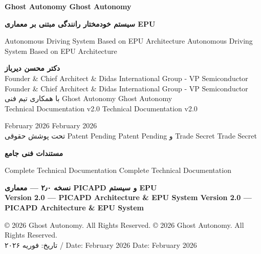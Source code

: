 \documentclass[10pt,twoside,openright]{report}
\makeatletter
\DeclareRobustCommand{\lat}[1]{%
  \ifHy@pdfstring
    #1%
  \else
    \beginL\setlatin #1\endL%
  \fi
}
\makeatother
\begin{document}
\begin{titlepage}
\centering
\vspace*{2cm}

{\Huge\bfseries\color{partExecutive}\lat{Ghost Autonomy}\par}
\vspace{0.3cm}
{\LARGE\bfseries\color{headerColor}سیستم خودمختار رانندگی مبتنی بر معماری EPU\par}
\vspace{0.3cm}
{\Large\color{chapterStrategy}\lat{Autonomous Driving System Based on EPU Architecture}\par}

\vspace{3cm}

\begin{tcolorbox}[
  colback=conceptBox,
  colframe=partExecutive,
  width=0.8\textwidth,
  arc=3mm,
  boxrule=1pt
]
\centering
\large
\textbf{دکتر محسن دیرباز}\\[5pt]
\lat{Founder \& Chief Architect \& Didas International Group - VP Semiconductor}\\[10pt]
\normalsize
با همکاری تیم فنی \lat{Ghost Autonomy}\\[5pt]
\lat{Technical Documentation v2.0}\\[15pt]
{\footnotesize\color{gray}
\lat{February 2026}\\
تحت پوشش حقوقی \lat{Patent Pending} و \lat{Trade Secret}
}
\end{tcolorbox}

\vfill


\vspace{2cm}

{\LARGE\bfseries\color{chapterMath}مستندات فنی جامع\par}
\vspace{0.2cm}
{\Large\color{sectionPhysics}\lat{Complete Technical Documentation}\par}

\vspace{1cm}

{\large\bfseries
نسخه ۲٫۰ — معماری PICAPD و سیستم EPU\\
\lat{Version 2.0 — PICAPD Architecture \& EPU System}
\par}

\vfill

{\large\color{gray}
\lat{© 2026 Ghost Autonomy. All Rights Reserved.}\\[5pt]
تاریخ: فوریه ۲۰۲۶ / \lat{Date: February 2026}
\par}
\end{titlepage}
\end{document}

